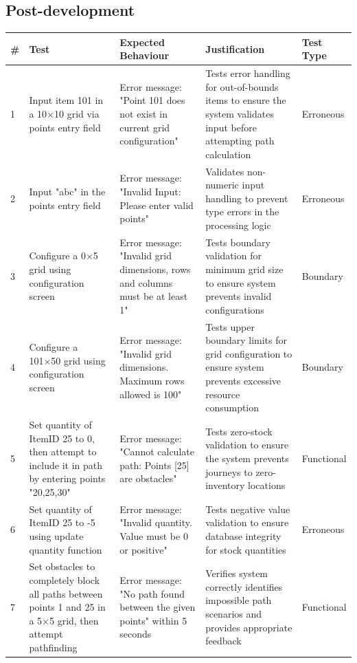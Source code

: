 \subsection{Post-development}

\begin{longtable}{|p{}|p{}|p{}|p{}|p{}|}
\hline
\textbf{\#} & \textbf{Test} & \textbf{Expected Behaviour} & \textbf{Justification} & \textbf{Test Type} \\
\hline
\endhead

1 & Input item 101 in a 10×10 grid via points entry field & Error message: "Point 101 does not exist in current grid configuration" & Tests error handling for out-of-bounds items to ensure the system validates input before attempting path calculation & Erroneous \\
\hline
2 & Input "abc" in the points entry field & Error message: "Invalid Input: Please enter valid points" & Validates non-numeric input handling to prevent type errors in the processing logic & Erroneous \\
\hline
3 & Configure a 0×5 grid using configuration screen & Error message: "Invalid grid dimensions, rows and columns must be at least 1" & Tests boundary validation for minimum grid size to ensure system prevents invalid configurations & Boundary \\
\hline
4 & Configure a 101×50 grid using configuration screen & Error message: "Invalid grid dimensions. Maximum rows allowed is 100" & Tests upper boundary limits for grid configuration to ensure system prevents excessive resource consumption & Boundary \\
\hline
5 & Set quantity of ItemID 25 to 0, then attempt to include it in path by entering points "20,25,30" & Error message: "Cannot calculate path: Points [25] are obstacles" & Tests zero-stock validation to ensure the system prevents journeys to zero-inventory locations & Functional \\
\hline
6 & Set quantity of ItemID 25 to -5 using update quantity function & Error message: "Invalid quantity. Value must be 0 or positive" & Tests negative value validation to ensure database integrity for stock quantities & Erroneous \\
\hline
7 & Set obstacles to completely block all paths between points 1 and 25 in a 5×5 grid, then attempt pathfinding & Error message: "No path found between the given points" within 5 seconds & Verifies system correctly identifies impossible path scenarios and provides appropriate feedback & Functional \\

\end{longtable}
